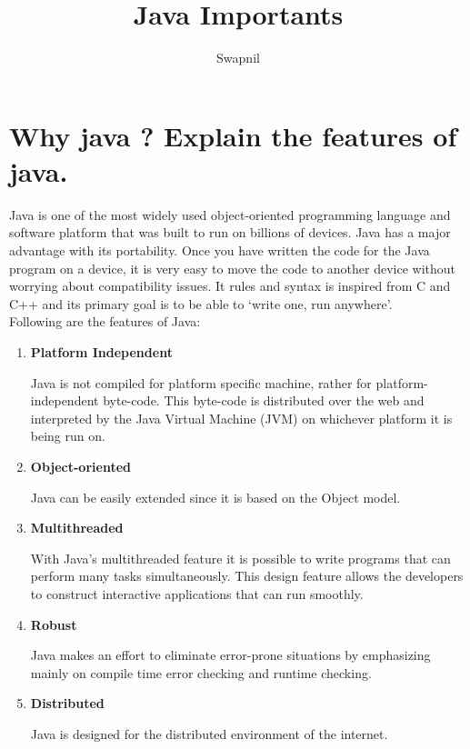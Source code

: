 \documentclass{article}
\title{Java Importants}
\author{Swapnil}
\begin{document}
\maketitle
{\parindent0pt

\section{Why java ? Explain the features of java.}
Java is one of the most widely used object-oriented programming language and software platform that was built to run on billions of devices. Java has a major advantage with its portability. Once you have written the code for the Java program on a device, it is very easy to move the code to another
device without worrying about compatibility issues. It rules and syntax is inspired from C and C++ and its primary goal is to be able to `write one, run anywhere'.
\ \\

Following are the features of Java:
\begin{enumerate}
  \item \textbf{Platform Independent}

    Java is not compiled for platform specific machine, rather for platform-independent byte-code. This byte-code is distributed over the web and interpreted by the Java Virtual Machine (JVM) on whichever platform it is being run on.

  \item \textbf{Object-oriented}

    Java can be easily extended since it is based on the Object model.

  \item \textbf{Multithreaded}

    With Java's multithreaded feature it is possible to write programs that can perform many tasks simultaneously. This design feature allows the developers to construct interactive applications that can run smoothly.

  \item \textbf{Robust}

    Java makes an effort to eliminate error-prone situations by emphasizing mainly on compile time error checking and runtime checking.

  \item \textbf{Distributed}

    Java is designed for the distributed environment of the internet.
\end{enumerate}

}
\end{document}
